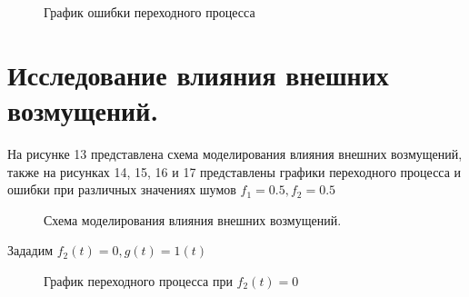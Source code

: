 \documentclass[a4paper, 11pt]{article}
\begin{document}
\begin{figure}[h!]
    \caption{График ошибки переходного процесса}
    \label{o:tree}
\end{figure}

\newpage

\section*{Исследование влияния внешних возмущений.}
На рисунке 13 представлена схема моделирования влияния внешних возмущений, также на рисунках 14, 15, 16 и 17 представлены графики переходного процесса и ошибки при различных значениях шумов $f_1=0.5,  f_2=0.5$

\begin{figure}[h!]
    \caption{Схема моделирования влияния внешних возмущений.}
    \label{tree}
\end{figure}

Зададим $f_2(t) = 0, g(t) = 1(t)$

\begin{figure}[h!]
    \caption{График переходного процесса при $f_2(t) = 0$}
    \label{two}
\end{figure}
\end{document}
